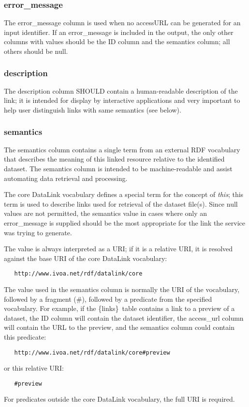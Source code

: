 \documentclass[11pt,a4paper]{ivoa}
\newcommand{\blinks}{\{links\}}
\begin{document}
\subsubsection{error\_message}

The error\_message column is used when no accessURL can be generated for
an input identifier. If an error\_message is included in the output, the
only other columns with values should be the ID column and the semantics
column; all others should be null.


\subsubsection{description}

The description column SHOULD contain a human-readable description of
the link; it is intended for display by interactive applications and very
important to help user distinguish links with same semantics (see below).


\subsubsection{semantics}

The semantics column contains a single term from an external RDF
vocabulary that describes the meaning of this linked resource relative
to the identified dataset. The semantics column is intended to be
machine-readable and assist automating data retrieval and processing.

The core DataLink vocabulary defines a special term for
the concept of {\em this\/};
this term is used to describe links used for retrieval of the
dataset file(s). Since null values are not permitted, the semantics
value in cases where only an error\_message is supplied should be the
most appropriate for the link the service was trying to generate.

The value is always interpreted as a URI; if it is a relative URI,
it is resolved \citep{std:RFC3986} against the base URI of the
core DataLink vocabulary:
\begin{verbatim}
   http://www.ivoa.net/rdf/datalink/core
\end{verbatim}

The value used in the semantics column is normally the URI of the
vocabulary, followed by a fragment (\#), followed by a predicate from
the specified vocabulary.  For example, if the \blinks\ table contains a
link to a preview of a dataset, the ID column will contain the dataset
identifier, the access\_url column will contain the URL to the preview,
and the semantics column could contain this predicate:
\begin{verbatim}
   http://www.ivoa.net/rdf/datalink/core#preview
\end{verbatim}
or this relative URI:
\begin{verbatim}
   #preview
\end{verbatim}
For predicates outside the core DataLink vocabulary,
the full URI is required.
\end{document}
